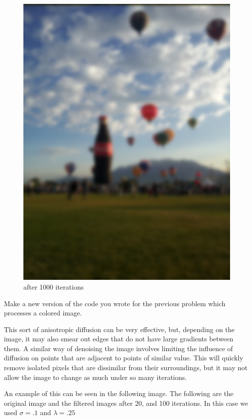 \begin{figure}[ht]
\begin{minipage}[b]{0.45\linewidth}
\includegraphics[width=\textwidth]{baloon_col1000}
\caption*{after 1000 iterations}
\end{minipage}
\end{figure}
\vfill
\clearpage

\begin{problem}
Make a new version of the code you wrote for the previous problem which processes a colored image.
\end{problem}

This sort of anisotropic diffusion can be very effective, but, depending on the image, it may also smear out edges that do not have large gradients between them.
A similar way of denoising the image involves limiting the influence of diffusion on points that are adjacent to points of similar value.
This will quickly remove isolated pixels that are dissimilar from their surroundings, but it may not allow the image to change as much under so many iterations.

An example of this can be seen in the following image.
The following are the original image and the filtered images after 20, and 100 iterations.
In this case we used $\sigma = .1$ and $\lambda = .25$

